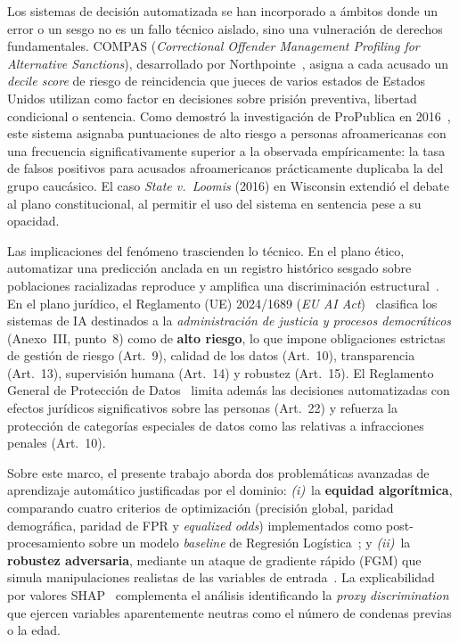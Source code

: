 \documentclass[11pt,a4paper]{article}
\begin{document}
Los sistemas de decisión automatizada se han incorporado a ámbitos donde un error o un sesgo no es un fallo técnico aislado, sino una vulneración de derechos fundamentales. COMPAS (\textit{Correctional Offender Management Profiling for Alternative Sanctions}), desarrollado por Northpointe~\cite{northpointe2015practitioner}, asigna a cada acusado un \textit{decile score} de riesgo de reincidencia que jueces de varios estados de Estados Unidos utilizan como factor en decisiones sobre prisión preventiva, libertad condicional o sentencia. Como demostró la investigación de ProPublica en 2016~\cite{angwin2016machine, propublica_compas_2016}, este sistema asignaba puntuaciones de alto riesgo a personas afroamericanas con una frecuencia significativamente superior a la observada empíricamente: la tasa de falsos positivos para acusados afroamericanos prácticamente duplicaba la del grupo caucásico. El caso \textit{State v.\ Loomis} (2016) en Wisconsin extendió el debate al plano constitucional, al permitir el uso del sistema en sentencia pese a su opacidad.

Las implicaciones del fenómeno trascienden lo técnico. En el plano ético, automatizar una predicción anclada en un registro histórico sesgado sobre poblaciones racializadas reproduce y amplifica una discriminación estructural~\cite{barocas2019fairness}. En el plano jurídico, el Reglamento (UE) 2024/1689 (\textit{EU AI Act})~\cite{eu_ai_act_2024} clasifica los sistemas de IA destinados a la \emph{administración de justicia y procesos democráticos} (Anexo~III, punto~8) como de \textbf{alto riesgo}, lo que impone obligaciones estrictas de gestión de riesgo (Art.~9), calidad de los datos (Art.~10), transparencia (Art.~13), supervisión humana (Art.~14) y robustez (Art.~15). El Reglamento General de Protección de Datos~\cite{gdpr2016} limita además las decisiones automatizadas con efectos jurídicos significativos sobre las personas (Art.~22) y refuerza la protección de categorías especiales de datos como las relativas a infracciones penales (Art.~10).

Sobre este marco, el presente trabajo aborda dos problemáticas avanzadas de aprendizaje automático justificadas por el dominio: \emph{(i)}~la \textbf{equidad algorítmica}, comparando cuatro criterios de optimización (precisión global, paridad demográfica, paridad de FPR y \textit{equalized odds}) implementados como post-procesamiento sobre un modelo \textit{baseline} de Regresión Logística~\cite{hardt2016equality, bird2020fairlearn}; y \emph{(ii)}~la \textbf{robustez adversaria}, mediante un ataque de gradiente rápido (FGM) que simula manipulaciones realistas de las variables de entrada~\cite{goodfellow2015explaining, nicolae2018art}. La explicabilidad por valores SHAP~\cite{lundberg2017unified} complementa el análisis identificando la \textit{proxy discrimination} que ejercen variables aparentemente neutras como el número de condenas previas o la edad.
\end{document}
